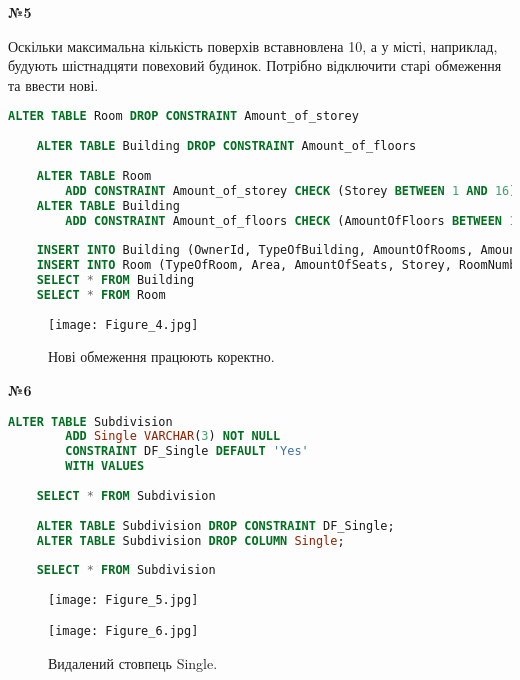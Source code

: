 \documentclass[a4paper,12pt]{article}
\begin{document}
	\begin{center}
		\textbf{№5}
	\end{center}
	Оскільки максимальна кількість поверхів вставновлена 10, а у місті, наприклад, будують шістнадцяти повеховий будинок. Потрібно відключити старі обмеження та ввести нові.
	\begin{lstlisting}[language=SQL]
	ALTER TABLE Room DROP CONSTRAINT Amount_of_storey
	
	ALTER TABLE Building DROP CONSTRAINT Amount_of_floors
	
	ALTER TABLE Room
		ADD CONSTRAINT Amount_of_storey CHECK (Storey BETWEEN 1 AND 16)
	ALTER TABLE Building
		ADD CONSTRAINT Amount_of_floors CHECK (AmountOfFloors BETWEEN 1 AND 16)
	
	INSERT INTO Building (OwnerId, TypeOfBuilding, AmountOfRooms, AmountOfFloors) VALUES (1, 'Enterprise', 35, 15);
	INSERT INTO Room (TypeOfRoom, Area, AmountOfSeats, Storey, RoomNumber, SeatsId, SubdivisionId, BiuldingId) VALUES ('Pantry', 290, 70, 16, 29, 1, 1, 2);
	SELECT * FROM Building
	SELECT * FROM Room
	\end{lstlisting}
\newpage
	\begin{figure}[h!]
		\centering
		\begin{minipage}[h]{1.05\linewidth}
			\texttt{[image: Figure\_4.jpg]}  
		\end{minipage}
		\caption{Нові обмеження працюють коректно.}
	\end{figure}
	
	\begin{center}
		\textbf{№6}
	\end{center}
	\begin{lstlisting}[language=SQL]
	ALTER TABLE Subdivision
		ADD Single VARCHAR(3) NOT NULL 
		CONSTRAINT DF_Single DEFAULT 'Yes'
		WITH VALUES
	
	SELECT * FROM Subdivision
	
	ALTER TABLE Subdivision DROP CONSTRAINT DF_Single;
	ALTER TABLE Subdivision DROP COLUMN Single;
	
	SELECT * FROM Subdivision
	\end{lstlisting}
	\begin{figure}[h!]
		\centering
		\begin{minipage}[h]{0.9\linewidth}
			\texttt{[image: Figure\_5.jpg]}  
		\end{minipage}
		\caption{Стовпець Single, тип даних VARCHAR(3), зі значенням по замовчуванню «Yes».}
		\begin{minipage}[h]{0.9\linewidth}
			\texttt{[image: Figure\_6.jpg]}  
		\end{minipage}
		\caption{Видалений стовпець Single.}
	\end{figure}
	
\end{document}
